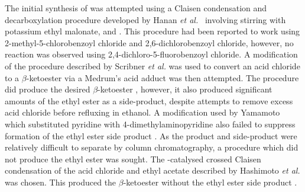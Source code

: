 
The initial synthesis of  was attempted using a Claisen condensation and decarboxylation procedure developed by Hanan \textit{et al.}\ \cite{Hanan2012} involving stirring  with potassium ethyl malonate,  and . This procedure had been reported to work using 2-methyl-5-chlorobenzoyl chloride and 2,6-dichlorobenzoyl chloride, however, no reaction was observed using 2,4-dichloro-5-fluorobenzoyl chloride. A modification of the procedure described by Scribner \textit{et al.} \cite{Scribner1978} was used to convert an acid chloride to a $\beta$-ketoester via a Medrum's acid adduct was then attempted. The procedure did produce the desired $\beta$-ketoester , however, it also produced significant amounts of the ethyl ester  as a side-product, despite attempts to remove excess acid chloride  before refluxing in ethanol. A modification used by Yamamoto \cite{Yamamoto1987} which substituted pyridine with 4-dimethylaminopyridine also failed to suppress formation of the ethyl ester side product . As the product and side-product were relatively difficult to separate by column chromatography, a procedure which did not produce the ethyl ester was sought. 
The -catalysed crossed Claisen condensation of the acid chloride  and ethyl acetate described by Hashimoto \textit{et al.} \cite{Hashimoto2006} was chosen. This produced the $\beta$-ketoester  without the ethyl ester side product .





